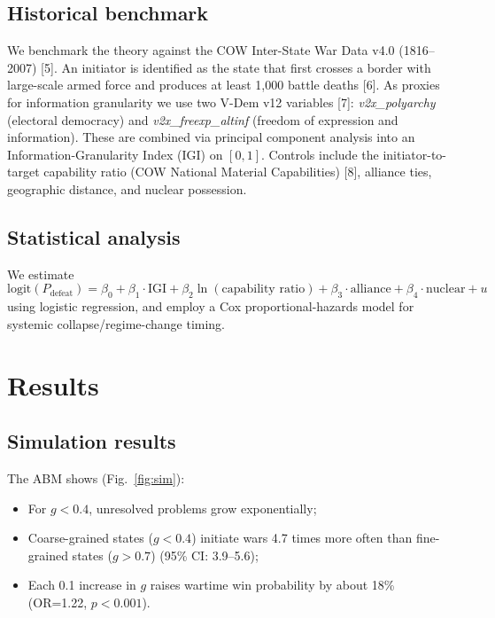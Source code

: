 \documentclass[11pt,a4paper]{article}
\begin{document}
\subsection{Historical benchmark}

We benchmark the theory against the COW Inter-State War Data v4.0 (1816--2007) [5]. An initiator is identified as the state that first crosses a border with large-scale armed force and produces at least 1,000 battle deaths [6]. As proxies for information granularity we use two V-Dem v12 variables [7]: \textit{v2x\_polyarchy} (electoral democracy) and \textit{v2x\_freexp\_altinf} (freedom of expression and information). These are combined via principal component analysis into an Information-Granularity Index (IGI) on $[0,1]$. Controls include the initiator-to-target capability ratio (COW National Material Capabilities) [8], alliance ties, geographic distance, and nuclear possession.

\subsection{Statistical analysis}

We estimate
\[
\text{logit}(P_{\text{defeat}}) = \beta_0 + \beta_1 \cdot \text{IGI} + \beta_2 \ln(\text{capability ratio}) + \beta_3 \cdot \text{alliance} + \beta_4 \cdot \text{nuclear} + u
\]
using logistic regression, and employ a Cox proportional-hazards model for systemic collapse/regime-change timing.

\section{Results}

\subsection{Simulation results}

The ABM shows (Fig.~\ref{fig:sim}):
\begin{itemize}
    \item For $g < 0.4$, unresolved problems grow exponentially;
    \item Coarse-grained states ($g<0.4$) initiate wars 4.7 times more often than fine-grained states ($g>0.7$) (95\% CI: 3.9--5.6);
    \item Each 0.1 increase in $g$ raises wartime win probability by about 18\% (OR=1.22, $p<0.001$).
\end{itemize}
\end{document}
